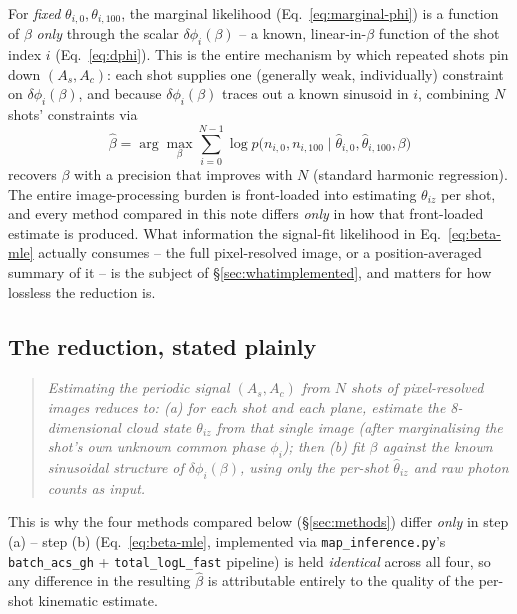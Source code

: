 \documentclass[11pt,a4paper]{article}
\newcommand{\code}[1]{\texttt{#1}}
\begin{document}
For \emph{fixed} $\theta_{i,0},\theta_{i,100}$, the marginal likelihood
(Eq.~\ref{eq:marginal-phi}) is a function of $\beta$ \emph{only} through the
scalar $\delta\phi_i(\beta)$ -- a known, linear-in-$\beta$ function of the
shot index $i$ (Eq.~\ref{eq:dphi}). This is the entire mechanism by which
repeated shots pin down $(A_s,A_c)$: each shot supplies one (generally weak,
individually) constraint on $\delta\phi_i(\beta)$, and because
$\delta\phi_i(\beta)$ traces out a known sinusoid in $i$, combining $N$
shots' constraints via
\begin{equation}
  \hat\beta = \arg\max_\beta \sum_{i=0}^{N-1}
    \log p\bigl(n_{i,0},n_{i,100}\mid\hat\theta_{i,0},\hat\theta_{i,100},\beta\bigr)
  \label{eq:beta-mle}
\end{equation}
recovers $\beta$ with a precision that improves with $N$ (standard harmonic
regression). The entire image-processing burden is front-loaded into
estimating $\theta_{iz}$ per shot, and every method compared in this note
differs \emph{only} in how that front-loaded estimate is produced. What
information the signal-fit likelihood in Eq.~\ref{eq:beta-mle} actually
consumes -- the full pixel-resolved image, or a position-averaged summary
of it -- is the subject of \S\ref{sec:whatimplemented}, and matters for how
lossless the reduction is.

\subsection{The reduction, stated plainly}

\begin{quote}
\emph{Estimating the periodic signal $(A_s,A_c)$ from $N$ shots of
pixel-resolved images reduces to: (a) for each shot and each plane,
estimate the 8-dimensional cloud state $\theta_{iz}$ from that single
image (after marginalising the shot's own unknown common phase $\phi_i$);
then (b) fit $\beta$ against the known sinusoidal structure of
$\delta\phi_i(\beta)$, using only the per-shot $\hat\theta_{iz}$ and raw
photon counts as input.}
\end{quote}

This is why the four methods compared below (\S\ref{sec:methods}) differ
\emph{only} in step (a) -- step (b) (Eq.~\ref{eq:beta-mle}, implemented via
\code{map\_inference.py}'s \code{batch\_acs\_gh} + \code{total\_logL\_fast}
pipeline) is held \emph{identical} across all four, so any difference in
the resulting $\hat\beta$ is attributable entirely to the quality of the
per-shot kinematic estimate.
\end{document}
